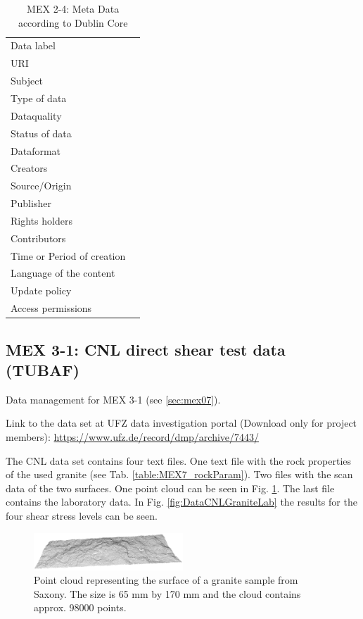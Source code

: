\begin{table}[h!]
\caption{MEX 2-4: Meta Data according to Dublin Core}
\label{tab:}
\small
\begin{tabular}{R{3cm}|L{7cm}}
\hline
%
Data label &  \\
URI &  \\
Subject  &  \\
Type of data  &  \\
Dataquality  &  \\
Status of data  &  \\
Dataformat  & \\
Creators  &  \\
Source/Origin &  \\
Publisher  &  \\
Rights holders &  \\
Contributors &  \\
Time or Period of creation &  \\
Language of the content &  \\
Update policy &  \\
Access permissions &  \\
%
\hline
\end{tabular}
\end{table}

\subsection{MEX 3-1: CNL direct shear test data (TUBAF)}\label{DataManMex3-1CNL}

Data management for MEX 3-1 (see \ref{sec:mex07}).

Link to the data set at UFZ data investigation portal (Download only for project members):
\url{https://www.ufz.de/record/dmp/archive/7443/}

The CNL data set contains four text files. One text file with the rock properties of the used granite (see Tab. \ref{table:MEX7_rockParam}). Two files with the scan data of the two surfaces. One point cloud can be seen in Fig. \ref{fig:DataCNLGranitePointCloud}. The last file contains the laboratory data. In Fig. \ref{fig:DataCNLGraniteLab} the results for the four shear stress levels can be seen.

\begin{figure}[!ht]
\begin{center}
\includegraphics[width=0.5\textwidth]{./figures/MEX7_Point_cloud.png}
\end{center}
\caption{Point cloud representing the surface of a granite sample from Saxony. The size is 65 mm by 170 mm and the cloud contains approx. 98000 points.}
\label{fig:DataCNLGranitePointCloud}
\end{figure}

